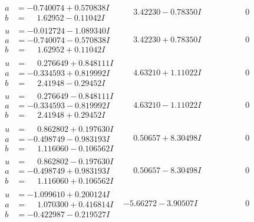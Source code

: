 \documentclass[1p]{elsarticle_modified}
\theoremstyle{definition}
\begin{document}
$$\begin{array}{c|c|c}
\begin{aligned}
a &= -0.740074 + 0.570838 I \\
b &= \phantom{-}1.62952 - 0.11042 I\end{aligned}
 & \phantom{-}3.42230 - 0.78350 I & \phantom{-0.000000 } 0 \\ \hline\begin{aligned}
u &= -0.012724 - 1.089340 I \\
a &= -0.740074 - 0.570838 I \\
b &= \phantom{-}1.62952 + 0.11042 I\end{aligned}
 & \phantom{-}3.42230 + 0.78350 I & \phantom{-0.000000 } 0 \\ \hline\begin{aligned}
u &= \phantom{-}0.276649 + 0.848111 I \\
a &= -0.334593 + 0.819992 I \\
b &= \phantom{-}2.41948 - 0.29452 I\end{aligned}
 & \phantom{-}4.63210 + 1.11022 I & \phantom{-0.000000 } 0 \\ \hline\begin{aligned}
u &= \phantom{-}0.276649 - 0.848111 I \\
a &= -0.334593 - 0.819992 I \\
b &= \phantom{-}2.41948 + 0.29452 I\end{aligned}
 & \phantom{-}4.63210 - 1.11022 I & \phantom{-0.000000 } 0 \\ \hline\begin{aligned}
u &= \phantom{-}0.862802 + 0.197630 I \\
a &= -0.498749 - 0.983193 I \\
b &= \phantom{-}1.116060 - 0.106562 I\end{aligned}
 & \phantom{-}0.50657 + 8.30498 I & \phantom{-0.000000 } 0 \\ \hline\begin{aligned}
u &= \phantom{-}0.862802 - 0.197630 I \\
a &= -0.498749 + 0.983193 I \\
b &= \phantom{-}1.116060 + 0.106562 I\end{aligned}
 & \phantom{-}0.50657 - 8.30498 I & \phantom{-0.000000 } 0 \\ \hline\begin{aligned}
u &= -1.099610 + 0.200124 I \\
a &= \phantom{-}1.070300 + 0.416814 I \\
b &= -0.422987 - 0.219527 I\end{aligned}
 & -5.66272 - 3.90507 I & \phantom{-0.000000 } 0 \\ \hline\begin{aligned}

\end{aligned}
\end{array}$$
\end{document}
